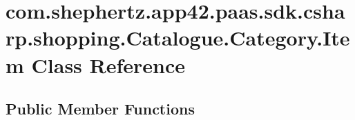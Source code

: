 \hypertarget{classcom_1_1shephertz_1_1app42_1_1paas_1_1sdk_1_1csharp_1_1shopping_1_1_catalogue_1_1_category_1_1_item}{\section{com.\+shephertz.\+app42.\+paas.\+sdk.\+csharp.\+shopping.\+Catalogue.\+Category.\+Item Class Reference}
\label{classcom_1_1shephertz_1_1app42_1_1paas_1_1sdk_1_1csharp_1_1shopping_1_1_catalogue_1_1_category_1_1_item}
}
\subsection*{Public Member Functions}
